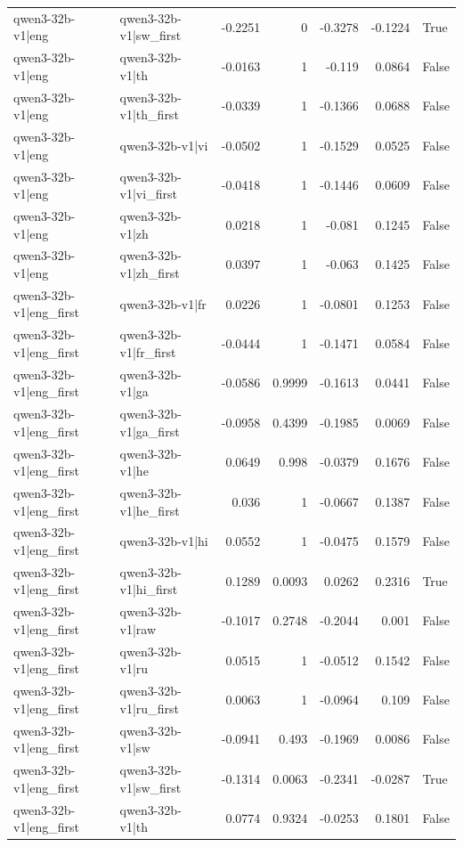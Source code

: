 \begin{table}
\begin{tabular}{l l r r r r l}
qwen3-32b-v1|eng & qwen3-32b-v1|sw_first & -0.2251 & 0 & -0.3278 & -0.1224 & True \\
qwen3-32b-v1|eng & qwen3-32b-v1|th & -0.0163 & 1 & -0.119 & 0.0864 & False \\
qwen3-32b-v1|eng & qwen3-32b-v1|th_first & -0.0339 & 1 & -0.1366 & 0.0688 & False \\
qwen3-32b-v1|eng & qwen3-32b-v1|vi & -0.0502 & 1 & -0.1529 & 0.0525 & False \\
qwen3-32b-v1|eng & qwen3-32b-v1|vi_first & -0.0418 & 1 & -0.1446 & 0.0609 & False \\
qwen3-32b-v1|eng & qwen3-32b-v1|zh & 0.0218 & 1 & -0.081 & 0.1245 & False \\
qwen3-32b-v1|eng & qwen3-32b-v1|zh_first & 0.0397 & 1 & -0.063 & 0.1425 & False \\
qwen3-32b-v1|eng_first & qwen3-32b-v1|fr & 0.0226 & 1 & -0.0801 & 0.1253 & False \\
qwen3-32b-v1|eng_first & qwen3-32b-v1|fr_first & -0.0444 & 1 & -0.1471 & 0.0584 & False \\
qwen3-32b-v1|eng_first & qwen3-32b-v1|ga & -0.0586 & 0.9999 & -0.1613 & 0.0441 & False \\
qwen3-32b-v1|eng_first & qwen3-32b-v1|ga_first & -0.0958 & 0.4399 & -0.1985 & 0.0069 & False \\
qwen3-32b-v1|eng_first & qwen3-32b-v1|he & 0.0649 & 0.998 & -0.0379 & 0.1676 & False \\
qwen3-32b-v1|eng_first & qwen3-32b-v1|he_first & 0.036 & 1 & -0.0667 & 0.1387 & False \\
qwen3-32b-v1|eng_first & qwen3-32b-v1|hi & 0.0552 & 1 & -0.0475 & 0.1579 & False \\
qwen3-32b-v1|eng_first & qwen3-32b-v1|hi_first & 0.1289 & 0.0093 & 0.0262 & 0.2316 & True \\
qwen3-32b-v1|eng_first & qwen3-32b-v1|raw & -0.1017 & 0.2748 & -0.2044 & 0.001 & False \\
qwen3-32b-v1|eng_first & qwen3-32b-v1|ru & 0.0515 & 1 & -0.0512 & 0.1542 & False \\
qwen3-32b-v1|eng_first & qwen3-32b-v1|ru_first & 0.0063 & 1 & -0.0964 & 0.109 & False \\
qwen3-32b-v1|eng_first & qwen3-32b-v1|sw & -0.0941 & 0.493 & -0.1969 & 0.0086 & False \\
qwen3-32b-v1|eng_first & qwen3-32b-v1|sw_first & -0.1314 & 0.0063 & -0.2341 & -0.0287 & True \\
qwen3-32b-v1|eng_first & qwen3-32b-v1|th & 0.0774 & 0.9324 & -0.0253 & 0.1801 & False \\

\end{tabular}
\end{table}
